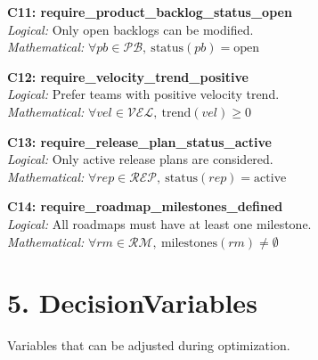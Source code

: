 \documentclass[12pt]{article}
\begin{document}
    \item \textbf{C11: require\_product\_backlog\_status\_open} \\
    \textit{Logical:} Only open backlogs can be modified. \\
    \textit{Mathematical:} $ \forall pb \in \mathcal{PB},\ \text{status}(pb) = \text{open} $

    \item \textbf{C12: require\_velocity\_trend\_positive} \\
    \textit{Logical:} Prefer teams with positive velocity trend. \\
    \textit{Mathematical:} $ \forall vel \in \mathcal{VEL},\ \text{trend}(vel) \geq 0 $

    \item \textbf{C13: require\_release\_plan\_status\_active} \\
    \textit{Logical:} Only active release plans are considered. \\
    \textit{Mathematical:} $ \forall rep \in \mathcal{REP},\ \text{status}(rep) = \text{active} $

    \item \textbf{C14: require\_roadmap\_milestones\_defined} \\
    \textit{Logical:} All roadmaps must have at least one milestone. \\
    \textit{Mathematical:} $ \forall rm \in \mathcal{RM},\ \text{milestones}(rm) \neq \emptyset $

\section{5. DecisionVariables}

Variables that can be adjusted during optimization.
\end{document}
